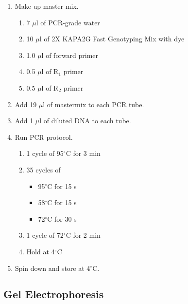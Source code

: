 \begin{enumerate}
\item Make up master mix.
  \begin{enumerate}
  \item 7 $\mu$l of PCR-grade water
  \item 10 $\mu$l of 2X KAPA2G Fast Genotyping Mix with dye
  \item 1.0 $\mu$l of forward primer
  \item 0.5 $\mu$l of R$_1$ primer
  \item 0.5 $\mu$l of R$_2$ primer
  \end{enumerate}
\item Add 19 $\mu$l of mastermix to each PCR tube.
\item Add 1 $\mu$l of diluted DNA to each tube.
\item Run PCR protocol.
  \begin{enumerate}
  \item 1 cycle of 95$^{\circ}$C for 3 min
  \item 35 cycles of
    \begin{itemize}
    \item 95$^{\circ}$C for 15 s
    \item 58$^{\circ}$C for 15 s
    \item 72$^{\circ}$C for 30 s
    \end{itemize}
  \item 1 cycle of 72$^{\circ}$C for 2 min
  \item Hold at 4$^{\circ}$C
  \end{enumerate}
\item Spin down and store at 4$^{\circ}$C.
\end{enumerate}

\subsection{Gel Electrophoresis}

